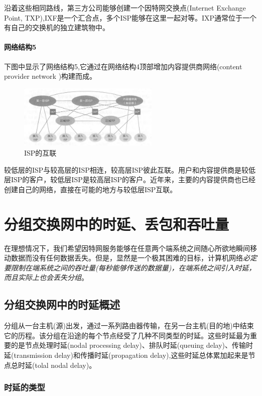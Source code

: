     沿着这些相同路线，第三方公司能够创建一个因特网交换点(Internet Exchange Point, TXP),IXF是一个汇合点，多个ISP能够在这里一起对等。IXP通常位于一个有自己的交换机的独立建筑物中。

\paragraph{网络结构5} 下图中显示了网络结构5,它通过在网络结构4顶部增加内容提供商网络(content provider network )构建而成。

\begin{figure}[!htbp]
    \centering
    \includegraphics[width=0.6\textwidth]{image/chapter01/网络结构5.png}
    \caption{ISP的互联}
\end{figure}

    较低层的ISP与较高层的ISP相连，较高层ISP彼此互联。用户和内容提供商是较低层ISP的客户，较低层ISP是较高层ISP的客户。近年来，主要的内容提供商也已经创建自己的网络，直接在可能的地方与较低层ISP互联。

\section{分组交换网中的时延、丢包和吞吐量}

    在理想情况下，我们希望因特网服务能够在任意两个端系统之间随心所欲地瞬间移动数据而没有任何数据丢失。但是，显然是一个极其困难的目标，计算机网络\emph{必定要限制在端系统之间的吞吐量(每秒能够传送的数据量)，在端系统之间引入时延，而且实际上也会丢失分组}。

\subsection{分组交换网中的时延概述}

    分组从一台主机(源)出发，通过一系列路由器传输，在另一台主机(目的地)中结束它的历程。该分组在沿途的每个节点经受了几种不同类型的时延。这些时延最为重要的是节点处理时延(nodal processing delay)、排队时延(queuing delay)、传输时延(transmission delay)和传播时延(propagation delay),这些时延总体累加起来是节点总时延(tolal nodal delay)。

\subsubsection{时延的类型}

